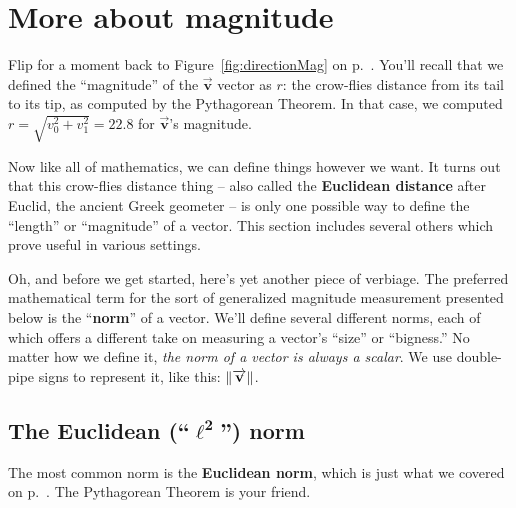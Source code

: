 \section{More about magnitude}
\label{sec:norms}


Flip for a moment back to Figure~\ref{fig:directionMag} on
p.~\pageref{fig:directionMag}. You'll recall that we defined the ``magnitude''
of the $\overrightarrow{\textbf{v}}$ vector as $r$: the crow-flies distance
from its tail to its tip, as computed by the Pythagorean Theorem. In that case,
we computed $r = \sqrt{v_0^2 + v_1^2} = 22.8$ for
$\overrightarrow{\textbf{v}}$'s magnitude.

Now like all of mathematics, we can define things however we want. It turns out
that this crow-flies distance thing -- also called the \textbf{Euclidean
distance} after Euclid, the ancient Greek geometer -- is only one possible way
to define the ``length'' or ``magnitude'' of a vector. This section includes
several others which prove useful in various settings.


Oh, and before we get started, here's yet another piece of verbiage. The
preferred mathematical term for the sort of generalized magnitude measurement
presented below is the ``\textbf{norm}'' of a vector. We'll define several
different norms, each of which offers a different take on measuring a vector's
``size'' or ``bigness.'' No matter how we define it, \textit{the norm of a
vector is always a scalar}. We use double-pipe signs to represent it, like
this: $\lVert\overrightarrow{\textbf{v}}\rVert$.

\subsection{The Euclidean (``$\boldsymbol\ell^\textbf{2}$'') norm}

\label{Euclideannorm}
The most common norm is the \textbf{Euclidean norm}, which is just what we
covered on p.~\pageref{fig:directionMag}. The Pythagorean Theorem is your
friend.

\label{cosineDotProduct}


